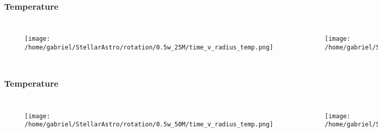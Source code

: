 \documentclass{beamer}
\begin{document}
\begin{frame}
\frametitle{Temperature}
        \begin{columns}[c]
\begin{figure}
    \begin{center}
      \texttt{[image: /home/gabriel/StellarAstro/rotation/0.5w\_25M/time\_v\_radius\_temp.png]}
    \end{center}
  \end{figure}

        \begin{figure}
    \begin{center}
      \texttt{[image: /home/gabriel/StellarAstro/rotation/0.9w\_25M/time\_v\_radius\_temp.png]}
    \end{center}
  \end{figure}

        \end{columns}
\end{frame}



\begin{frame}
\frametitle{Temperature}
        \begin{columns}[c]
\begin{figure}
    \begin{center}
      \texttt{[image: /home/gabriel/StellarAstro/rotation/0.5w\_50M/time\_v\_radius\_temp.png]}
    \end{center}
  \end{figure}

        \begin{figure}
    \begin{center}
      \texttt{[image: /home/gabriel/StellarAstro/rotation/0.9w\_50M/time\_v\_radius\_temp.png]}
    \end{center}
  \end{figure}

        \end{columns}
\end{frame}

\end{document}
